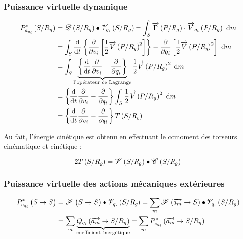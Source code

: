 \documentclass[UTF8]{ctexart}%
\begin{document}
\subsubsection{Puissance virtuelle dynamique}
\label{sec:PuissanceVirtuelleDynamique}
\begin{align}
P_{a_{q_i}}^{\ast}\left(S/R_g\right)&=\mathlarger{\mathscr{D}}\left(S/R_g\right)\bullet\mathlarger{\mathscr{V}}_{q_i}\left(S/R_g\right)=\int_{S}\overrightarrow{\Gamma}\left(P/R_g\right)\cdot\overrightarrow{V}_{q_i}\left(P/R_g\right)\ \mathrm{d}m\notag \\ &=\int_{S}\frac{\mathrm{d}}{\mathrm{d}t}\left\{\frac{\partial}{\partial v_i}\left[\frac{1}{2}\overrightarrow{V}\left(P/R_g\right)^2\right]\right\}-\frac{\partial}{\partial q_i}\left[\frac{1}{2}\overrightarrow{V}\left(P/R_g\right)^2\right]\ \mathrm{d}m\notag \\ &=\int_{S}\underbrace{\left\{\frac{\mathrm{d}}{\mathrm{d}t}\frac{\partial}{\partial v_i}-\frac{\partial}{\partial q_i}\right\}}_{\text{l'opérateur de Lagrange}}\frac{1}{2}\overrightarrow{V}\left(P/R_g\right)^2\ \mathrm{d}m\notag \\ &=\left\{\frac{\mathrm{d}}{\mathrm{d}t}\frac{\partial}{\partial v_i}-\frac{\partial}{\partial q_i}\right\}\int_{S}\frac{1}{2}\overrightarrow{V}\left(P/R_g\right)^2\ \mathrm{d}m\notag \\ &=\left\{\frac{\mathrm{d}}{\mathrm{d}t}\frac{\partial}{\partial v_i}-\frac{\partial}{\partial q_i}\right\}T\left(S/R_g\right)
\end{align}

Au fait, l'énergie cinétique est obtenu en effectuant le comoment des torseurs cinématique et cinétique :

\begin{equation}
2T\left(S/R_g\right)=\mathlarger{\mathscr{V}}\left(S/R_g\right)\bullet \mathlarger{\mathscr{C}}\left(S/R_g\right)
\end{equation}



\subsubsection{Puissance virtuelle des actions mécaniques extérieures}
\label{sec:PuissanceVirtuelleDesActionsMécaniquesExtérieures}
\begin{align}
P_{e_{q_i}}^{\ast}\left(\overline{S}\rightarrow S\right)&=\mathlarger{\mathscr{F}}\left(\overline{S}\rightarrow S\right)\bullet\mathlarger{\mathscr{V}}_{q_i}\left(S/R_g\right)=\sum_{m}\mathlarger{\mathscr{F}}\left(\overrightarrow{a_m}\rightarrow S\right)\bullet\mathlarger{\mathscr{V}}_{q_i}\left(S/R_g\right)\notag \\ &=\sum_{m}\underbrace{Q_{q_i}\left(\overrightarrow{a_m}\rightarrow S/R_g\right)}_{\text{coefficient énergétique}}=\sum_{m}P_{e_{q_i}}^{\ast}\left(\overrightarrow{a_m}\rightarrow S/R_g\right)
\end{align}
\end{document}

